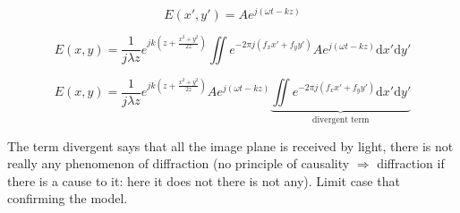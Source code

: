 \documentclass[10pt,a4paper]{article}
\begin{document}
\[E(x',y')=Ae^{j(\omega t-kz)}\]

\[
E(x,y)=\frac{1}{j\lambda z} e^{jk\left(z+\frac{x^2+y^2}{2z}\right)}
\iint e^{-2\pi j(f_xx'+f_yy')}
Ae^{j(\omega t-kz)}\mathrm{d}x'\mathrm{d}y'
\]

\[
E(x,y)=\frac{1}{j\lambda z} e^{jk\left(z+\frac{x^2+y^2}{2z}\right)} Ae^{j(\omega t-kz)}
\underbrace{
	\iint e^{-2\pi j(f_xx'+f_yy')}
	\mathrm{d}x'\mathrm{d}y'
}_\text{divergent term}
\]

The term divergent says that all the image plane is received by light, there is not really any phenomenon of diffraction (no principle of causality $\Rightarrow$ diffraction if there is a cause to it: here it does not there is not any). Limit case that confirming the model.
\end{document}
